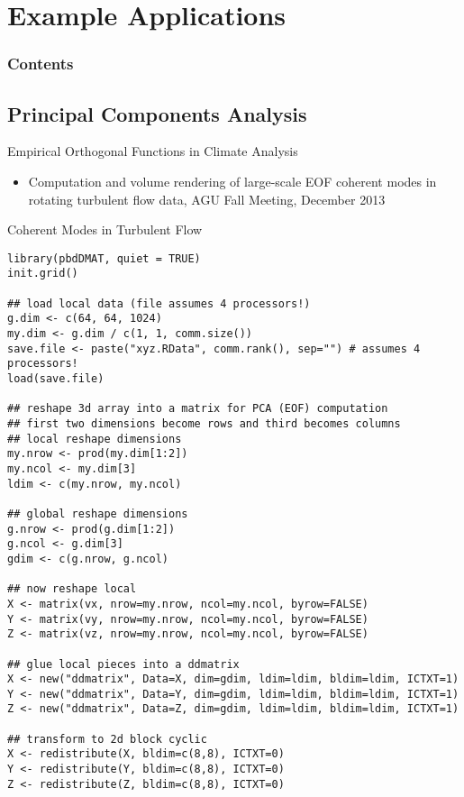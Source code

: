 \section{Example Applications}

\hidenum
\begin{frame}[noframenumbering]
\frametitle{Contents}
 \tableofcontents[currentsection,hideothersubsections,sectionstyle=show/hide]
\end{frame}
\shownum

\subsection{Principal Components Analysis}

\begin{frame}
\begin{block}{Empirical Orthogonal Functions in Climate Analysis}
\begin{itemize}
\item Computation and volume rendering of large-scale EOF coherent
  modes in rotating turbulent flow data, AGU Fall Meeting, December 2013
\end{itemize}
\end{block}
\end{frame}

\begin{frame}
  \begin{exampleblock}{Coherent Modes in Turbulent Flow}\pause
\begin{lstlisting}[title=Get and Redistribute the Data]
library(pbdDMAT, quiet = TRUE)
init.grid()

## load local data (file assumes 4 processors!)
g.dim <- c(64, 64, 1024)
my.dim <- g.dim / c(1, 1, comm.size())
save.file <- paste("xyz.RData", comm.rank(), sep="") # assumes 4 processors!
load(save.file)

## reshape 3d array into a matrix for PCA (EOF) computation
## first two dimensions become rows and third becomes columns
## local reshape dimensions
my.nrow <- prod(my.dim[1:2])
my.ncol <- my.dim[3]
ldim <- c(my.nrow, my.ncol)

## global reshape dimensions
g.nrow <- prod(g.dim[1:2])
g.ncol <- g.dim[3]
gdim <- c(g.nrow, g.ncol)

## now reshape local
X <- matrix(vx, nrow=my.nrow, ncol=my.ncol, byrow=FALSE)
Y <- matrix(vy, nrow=my.nrow, ncol=my.ncol, byrow=FALSE)
Z <- matrix(vz, nrow=my.nrow, ncol=my.ncol, byrow=FALSE)

## glue local pieces into a ddmatrix
X <- new("ddmatrix", Data=X, dim=gdim, ldim=ldim, bldim=ldim, ICTXT=1)
Y <- new("ddmatrix", Data=Y, dim=gdim, ldim=ldim, bldim=ldim, ICTXT=1)
Z <- new("ddmatrix", Data=Z, dim=gdim, ldim=ldim, bldim=ldim, ICTXT=1)

## transform to 2d block cyclic
X <- redistribute(X, bldim=c(8,8), ICTXT=0)
Y <- redistribute(Y, bldim=c(8,8), ICTXT=0)
Z <- redistribute(Z, bldim=c(8,8), ICTXT=0)
\end{lstlisting}
  \end{exampleblock}
\end{frame}

